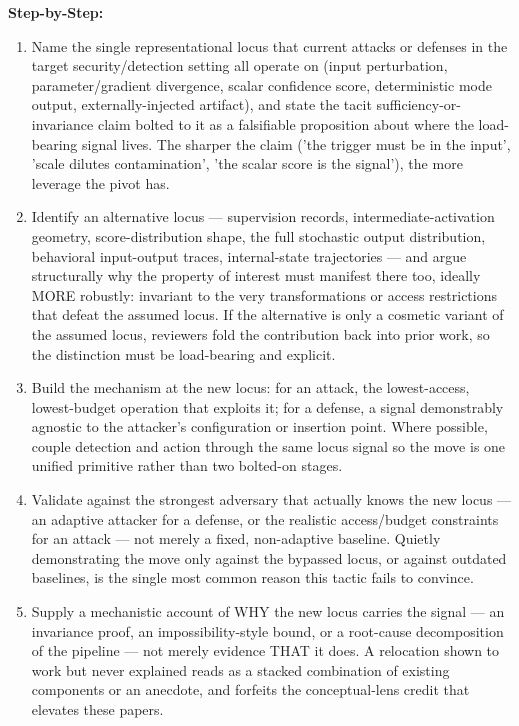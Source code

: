 \begin{tcolorbox}[colback=bgskill!50, colframe=cgreen!70, title={\textbf{C01} \textcolor{gray}{\small (O20/H9/R21)}}, breakable, before skip=4pt, after skip=4pt]
\textbf{Step-by-Step:}
\begin{enumerate}[leftmargin=14pt,topsep=2pt,itemsep=1pt]
  \item Name the single representational locus that current attacks or defenses in the target security/detection setting all operate on (input perturbation, parameter/gradient divergence, scalar confidence score, deterministic mode output, externally-injected artifact), and state the tacit sufficiency-or-invariance claim bolted to it as a falsifiable proposition about where the load-bearing signal lives. The sharper the claim ('the trigger must be in the input', 'scale dilutes contamination', 'the scalar score is the signal'), the more leverage the pivot has.
  \item Identify an alternative locus --- supervision records, intermediate-activation geometry, score-distribution shape, the full stochastic output distribution, behavioral input-output traces, internal-state trajectories --- and argue structurally why the property of interest must manifest there too, ideally MORE robustly: invariant to the very transformations or access restrictions that defeat the assumed locus. If the alternative is only a cosmetic variant of the assumed locus, reviewers fold the contribution back into prior work, so the distinction must be load-bearing and explicit.
  \item Build the mechanism at the new locus: for an attack, the lowest-access, lowest-budget operation that exploits it; for a defense, a signal demonstrably agnostic to the attacker's configuration or insertion point. Where possible, couple detection and action through the same locus signal so the move is one unified primitive rather than two bolted-on stages.
  \item Validate against the strongest adversary that actually knows the new locus --- an adaptive attacker for a defense, or the realistic access/budget constraints for an attack --- not merely a fixed, non-adaptive baseline. Quietly demonstrating the move only against the bypassed locus, or against outdated baselines, is the single most common reason this tactic fails to convince.
  \item Supply a mechanistic account of WHY the new locus carries the signal --- an invariance proof, an impossibility-style bound, or a root-cause decomposition of the pipeline --- not merely evidence THAT it does. A relocation shown to work but never explained reads as a stacked combination of existing components or an anecdote, and forfeits the conceptual-lens credit that elevates these papers.

\end{enumerate}
\end{tcolorbox}
